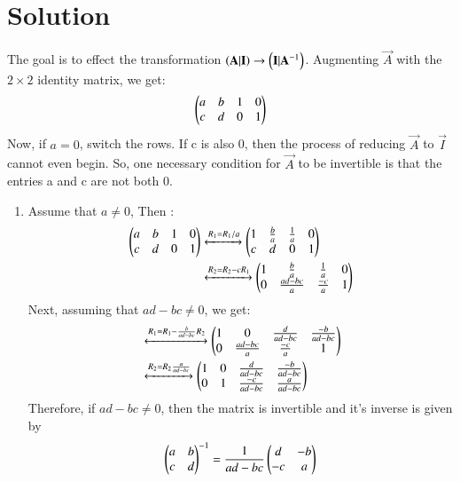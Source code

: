 \documentclass[journal,12pt,twocolumn]{IEEEtran}
\begin{document}
\section{Solution}
The goal is to effect the transformation $\left(\mathbf{A}|\mathbf{I}\right) \rightarrow \left(\mathbf{I}|\mathbf{A}^{-1}\right)$. Augmenting $\vec{A}$ with the $2 \times 2$ identity matrix, we get:
\begin{align}
 \begin{pmatrix}a & b & 1 & 0 \\ c & d & 0 & 1\end{pmatrix} 
\end{align}
Now, if $a = 0$, switch the rows. If c is also 0, then the process of reducing $\vec{A}$ to $\vec{I}$ cannot even begin. So, one necessary condition for $\vec{A}$ to be invertible is that the entries a and c are not both 0. 
\begin{enumerate}
    \item Assume that $a \neq 0$, Then :
\begin{align}
     \label{anotzero}\begin{pmatrix}a & b & 1 & 0 \\ c & d & 0 & 1\end{pmatrix}
&\xleftrightarrow{R_1 
= R_1/a} \begin{pmatrix}1 & \frac{b}{a} & \frac{1}{a} & 0 \\ c & d & 0 & 1\end{pmatrix}\\
&\xleftrightarrow{R_2 = R_2 - c R_1} \begin{pmatrix}1 & \frac{b}{a} & \frac{1}{a} & 0 \\ 0 & \frac{ad-bc}{a} & \frac{-c}{a} & 1\end{pmatrix}\nonumber
\end{align}
Next, assuming that $ad - bc \neq 0$, we get:
\begin{align}
    &\xleftrightarrow{R_1 = R_1 - \frac{b}{ad-bc} R_2} \begin{pmatrix}1 & 0 & \frac{d}{ad-bc} & \frac{-b}{ad-bc} \\ 0 & \frac{ad-bc}{a} & \frac{-c}{a} & 1\end{pmatrix} \nonumber\\
    &\xleftrightarrow{R_2 = R_2\frac{a}{ad-bc}} \begin{pmatrix}1 & 0 & \frac{d}{ad-bc} & \frac{-b}{ad-bc} \\ 0 & 1 & \frac{-c}{ad-bc} & \frac{a}{ad-bc}\end{pmatrix} \nonumber
\end{align}
Therefore, if $ad - bc \neq 0$, then the matrix is invertible and it's inverse is given by 
\begin{align}
    \begin{pmatrix}a & b \\ c  & d\end{pmatrix}^{-1} = \frac{1}{ad-bc}\begin{pmatrix}d & -b \\ -c  & a\end{pmatrix}
\end{align}


\end{enumerate}
\end{document}
